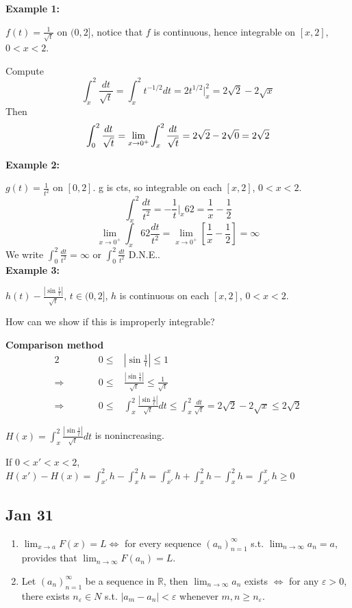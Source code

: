 \documentclass[12pt]{article}
\theoremstyle{plain}
\newcommand{\abs}[1]{\left| #1 \right|}
\newcommand{\mR}{{\mathbb{R}}}
\newcommand{\ep}{\varepsilon}
\begin{document}
	{\color{Brown}

		\textbf{Example 1:}

		$f(t) = \frac1{\sqrt t}$ on $(0,2]$, notice that
		$f$ is continuous, hence integrable on $[x,2]$, $0 < x < 2$. 

		Compute 
		\[
			\int_x^2 \frac{dt}{\sqrt t} = \int_x^2 t^{-1/2}dt = 2t^{1/2}
			\bigg\vert_x^2 = 2\sqrt 2-2\sqrt x
		\]
		Then 
		\[
			\int_0^2 \frac{dt}{\sqrt t} = \lim_{x\to 0^+} \int_x^2\frac{dt}
			{\sqrt t} = 2\sqrt 2 - 2\sqrt 0 = 2\sqrt 2\\
		\]
		
		\textbf{Example 2: } 

		$g(t) = \frac 1{t^2}$ on $[0,2]$. g is cts, so 
		integrable on each $[x,2]$, $0 < x < 2$. 
		\[
			\int_x^2\frac{dt}{t^2} = -\frac 1t\bigg\vert_x62 = \frac1x-\frac12
		\]
		\[
			\lim_{x\to 0^+} \int_x62 \frac{dt}{t^2} = \lim_{x\to 0^+}
			[\frac1x-\frac12] = \infty
		\]
		We write $\int_0^2 \frac{dt}{t^2}=\infty$ or $\int_0^2 \frac{dt}{t^2}$
		D.N.E.. \\
	
		\textbf{Example 3: } 

		$h(t) - \frac{\abs{\sin\frac1t}}{\sqrt t}$, 
		$t\in (0,2]$, $h$ is continuous on each $[x, 2]$, $0 < x < 2$. 

		How can we show if this is improperly integrable? 

		\textbf{Comparison method}
		\begin{alignat*}{2}
			& \qquad & 0\leq& \abs{\sin \frac1t} \leq 1\\
			\Rightarrow & \qquad & 0 \leq& \frac{\abs{\sin \frac 1t}}{\sqrt t}
			\leq \frac1{\sqrt t} \\
			\Rightarrow & \qquad & 0\leq& \int _x^2 \frac{\abs{\sin \frac1t}}
			{\sqrt t} dt \leq \int_x^2 \frac{dt}{\sqrt t} = 2\sqrt 2 - 2\sqrt x
			\leq 2\sqrt 2
		\end{alignat*}
		
		$H(x) = \int_x^2 \frac{\abs{\sin \frac1t}}{\sqrt t}dt$ is nonincreasing.

		If $0<x'<x<2$, $H(x') - H(x) = \int_{x'}^2 h - \int_x^2 h =
		\int_{x'}^x h + \int_x^2 h - \int_x^2 h = \int_{x'}^x h \geq 0$ 
	}

	\subsection{Jan 31}

	\begin{enumerate}
		\item $\lim_{x\to a} F(x) = L \Leftrightarrow$ for every sequence 
			$(a_n)^{\infty}_{n=1}$ s.t. $\lim_{n\to\infty} a_n=a$, provides 
			that $\lim_{n\to\infty} F(a_n) = L$. 
		\item Let $(a_n)_{n=1}^{\infty}$ be a sequence in $\mR$, then 
			$\lim_{n\to\infty} a_n$ exists $\Leftrightarrow$ for any $\ep>0$, 
			there exists $n_\ep \in N$ s.t. 
			$\abs{a_m-a_n} <\ep$ whenever $m,n \geq n_{\ep}$. \\
	\end{enumerate}
\end{document}
